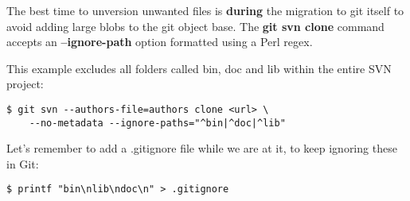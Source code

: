 \documentclass{../common/tufte-latex/tufte-handout}
\begin{document}
The best time to unversion unwanted files is \textbf{during} the migration to git itself to avoid adding large blobs to the git object base.
The \textbf{git svn clone} command accepts an \textbf{--ignore-path} option formatted using a Perl regex.

This example excludes all folders called bin, doc and lib within the entire SVN project:

\begin{lstlisting}[style=BashInputStyle]
  $ git svn --authors-file=authors clone <url> \ 
    --no-metadata --ignore-paths="^bin|^doc|^lib"
\end{lstlisting}

Let's remember to add a .gitignore file while we are at it, to keep ignoring these in Git:

\begin{lstlisting}[style=BashInputStyle]
  $ printf "bin\nlib\ndoc\n" > .gitignore
\end{lstlisting}




\end{document}
